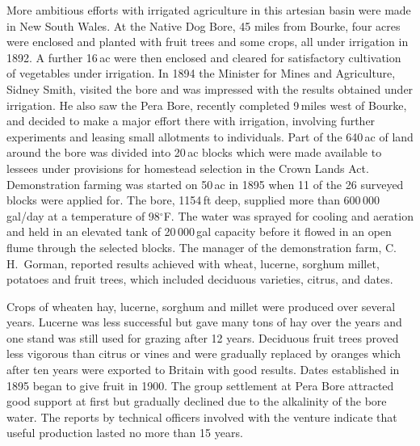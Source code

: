 More ambitious efforts with irrigated agriculture in this artesian
basin were made in New South Wales.  At the Native Dog Bore, 45 miles
from Bourke, four acres were enclosed and planted with fruit trees and
some crops, all under irrigation in 1892.  A further 16\,ac were then
enclosed and cleared for satisfactory cultivation of vegetables under
irrigation.  In 1894 the Minister for Mines and Agriculture, Sidney
Smith, visited the bore and was impressed with the results obtained
under irrigation.  He also saw the Pera Bore, recently completed
9\,miles west of Bourke, and decided to make a major effort there with
irrigation, involving further experiments and leasing small allotments
to individuals.  Part of the 640\,ac of land around the bore was
divided into 20\,ac blocks which were made available to lessees under
provisions for homestead selection in the Crown Lands Act.  Demonstration farming was started
on 50\,ac in 1895 when 11 of the 26 surveyed blocks were applied
for. The bore, 1154\,ft deep, supplied more than 600\,000\,gal/day at
a temperature of 98$^\circ$F.  The water was sprayed for cooling and
aeration and held in an elevated tank of 20\,000\,gal capacity before
it flowed in an open flume through the selected blocks.  The manager
of the demonstration farm, C.\,H.~Gorman, reported results achieved
with wheat, lucerne, sorghum millet, potatoes and fruit trees, which
included deciduous varieties, citrus, and dates.

Crops of wheaten hay, lucerne, sorghum and millet were produced over
several years.  Lucerne was less successful but gave many tons of hay
over the years and one stand was still used for grazing after 12
years.
Deciduous fruit trees proved less vigorous than citrus or vines and
were gradually replaced by oranges which after ten years were exported
to Britain with good results.  Dates established in 1895 began to give
fruit in 1900.  The group settlement at Pera Bore attracted good
support at first but gradually declined due to the alkalinity of the
bore water. The
reports by technical officers involved with the venture indicate that
useful production lasted no more than 15 years.

